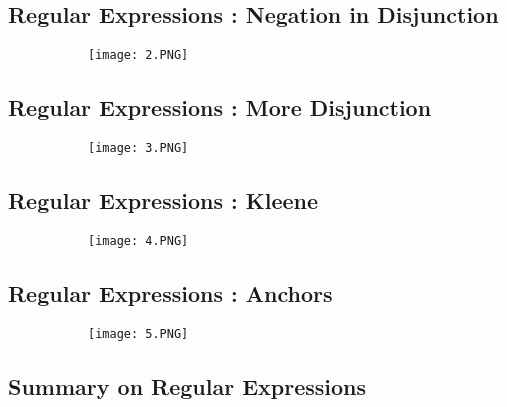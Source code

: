 \documentclass{article}
\begin{document}
\subsection{Regular Expressions : Negation in Disjunction}

\begin{figure}[ht!]
  \centering
  \begin{subfigure}[b]{0.8\linewidth}
    \texttt{[image: 2.PNG]}
  \end{subfigure}
\end{figure}

\vspace{30mm}
\subsection{Regular Expressions : More Disjunction}

\begin{figure}[ht!]
  \centering
  \begin{subfigure}[b]{0.8\linewidth}
    \texttt{[image: 3.PNG]}
  \end{subfigure}
\end{figure}

\subsection{Regular Expressions : Kleene}

\begin{figure}[ht!]
  \centering
  \begin{subfigure}[b]{0.8\linewidth}
    \texttt{[image: 4.PNG]}
  \end{subfigure}
\end{figure}

\subsection{Regular Expressions : Anchors}

\begin{figure}[ht!]
  \centering
  \begin{subfigure}[b]{0.8\linewidth}
    \texttt{[image: 5.PNG]}
  \end{subfigure}
\end{figure}

\vspace{20mm}
\subsection{Summary on Regular Expressions}
\end{document}
